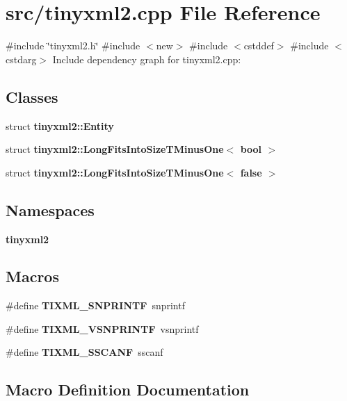 \section{src/tinyxml2.cpp File Reference}
\label{tinyxml2_8cpp}
{\ttfamily \#include \char`\"{}tinyxml2.\+h\char`\"{}}\newline
{\ttfamily \#include $<$new$>$}\newline
{\ttfamily \#include $<$cstddef$>$}\newline
{\ttfamily \#include $<$cstdarg$>$}\newline
Include dependency graph for tinyxml2.\+cpp\+:
\subsection*{Classes}
\begin{DoxyCompactItemize}
\item 
struct \textbf{ tinyxml2\+::\+Entity}
\item 
struct \textbf{ tinyxml2\+::\+Long\+Fits\+Into\+Size\+T\+Minus\+One$<$ bool $>$}
\item 
struct \textbf{ tinyxml2\+::\+Long\+Fits\+Into\+Size\+T\+Minus\+One$<$ false $>$}
\end{DoxyCompactItemize}
\subsection*{Namespaces}
\begin{DoxyCompactItemize}
\item 
 \textbf{ tinyxml2}
\end{DoxyCompactItemize}
\subsection*{Macros}
\begin{DoxyCompactItemize}
\item 
\#define \textbf{ T\+I\+X\+M\+L\+\_\+\+S\+N\+P\+R\+I\+N\+TF}~snprintf
\item 
\#define \textbf{ T\+I\+X\+M\+L\+\_\+\+V\+S\+N\+P\+R\+I\+N\+TF}~vsnprintf
\item 
\#define \textbf{ T\+I\+X\+M\+L\+\_\+\+S\+S\+C\+A\+NF}~sscanf
\end{DoxyCompactItemize}


\subsection{Macro Definition Documentation}
\mbox{\label{tinyxml2_8cpp_afc6433f9b56e4f18833089b1df629e0a}} 

